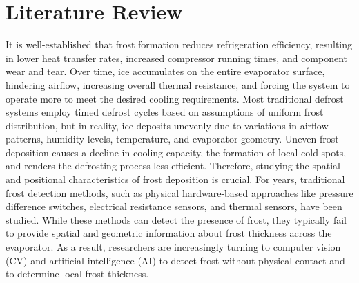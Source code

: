 \documentclass[a4paper,fleqn]{cas-dc}
\begin{document}
\section{Literature Review}\label{sec:litrev}
It is well-established that frost formation reduces refrigeration efficiency, resulting in lower heat transfer rates, increased compressor running times, and component wear and tear. Over time, ice accumulates on the entire evaporator surface, hindering airflow, increasing overall thermal resistance, and forcing the system to operate more to meet the desired cooling requirements. Most traditional defrost systems employ timed defrost cycles based on assumptions of uniform frost distribution, but in reality, ice deposits unevenly due to variations in airflow patterns, humidity levels, temperature, and evaporator geometry. Uneven frost deposition causes a decline in cooling capacity, the formation of local cold spots, and renders the defrosting process less efficient. Therefore, studying the spatial and positional characteristics of frost deposition is crucial. For years, traditional frost detection methods, such as physical hardware-based approaches like pressure difference switches, electrical resistance sensors, and thermal sensors, have been studied. While these methods can detect the presence of frost, they typically fail to provide spatial and geometric information about frost thickness across the evaporator. As a result, researchers are increasingly turning to computer vision (CV) and artificial intelligence (AI) to detect frost without physical contact and to determine local frost thickness.
\end{document}
